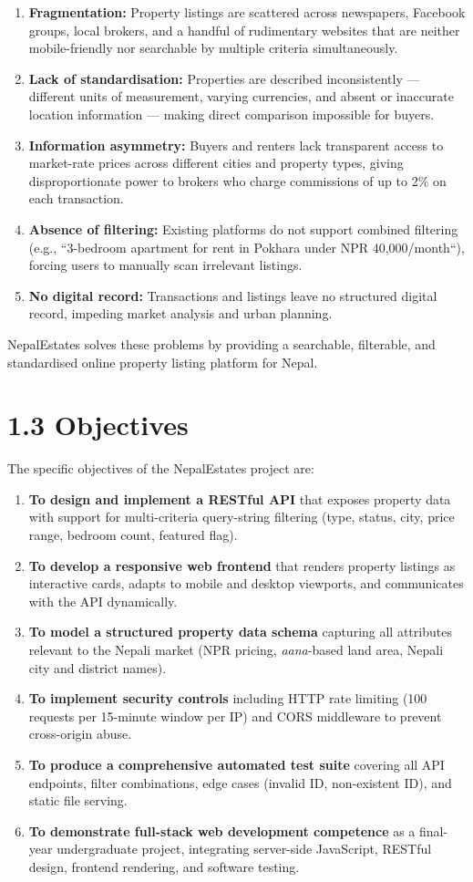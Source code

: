\documentclass[12pt,a4paper]{report}
\begin{document}
\begin{enumerate}
  \item \textbf{Fragmentation:} Property listings are scattered across newspapers, Facebook groups, local brokers, and a handful of rudimentary websites that are neither mobile-friendly nor searchable by multiple criteria simultaneously.
  \item \textbf{Lack of standardisation:} Properties are described inconsistently --- different units of measurement, varying currencies, and absent or inaccurate location information --- making direct comparison impossible for buyers.
  \item \textbf{Information asymmetry:} Buyers and renters lack transparent access to market-rate prices across different cities and property types, giving disproportionate power to brokers who charge commissions of up to 2\% on each transaction.
  \item \textbf{Absence of filtering:} Existing platforms do not support combined filtering (e.g., ``3-bedroom apartment for rent in Pokhara under NPR 40,000/month``), forcing users to manually scan irrelevant listings.
  \item \textbf{No digital record:} Transactions and listings leave no structured digital record, impeding market analysis and urban planning.
\end{enumerate}
NepalEstates solves these problems by providing a searchable, filterable, and standardised online property listing platform for Nepal.

\section{1.3 Objectives}
The specific objectives of the NepalEstates project are:

\begin{enumerate}
  \item \textbf{To design and implement a RESTful API} that exposes property data with support for multi-criteria query-string filtering (type, status, city, price range, bedroom count, featured flag).
  \item \textbf{To develop a responsive web frontend} that renders property listings as interactive cards, adapts to mobile and desktop viewports, and communicates with the API dynamically.
  \item \textbf{To model a structured property data schema} capturing all attributes relevant to the Nepali market (NPR pricing, \textit{aana}-based land area, Nepali city and district names).
  \item \textbf{To implement security controls} including HTTP rate limiting (100 requests per 15-minute window per IP) and CORS middleware to prevent cross-origin abuse.
  \item \textbf{To produce a comprehensive automated test suite} covering all API endpoints, filter combinations, edge cases (invalid ID, non-existent ID), and static file serving.
  \item \textbf{To demonstrate full-stack web development competence} as a final-year undergraduate project, integrating server-side JavaScript, RESTful design, frontend rendering, and software testing.
\end{enumerate}
\end{document}
